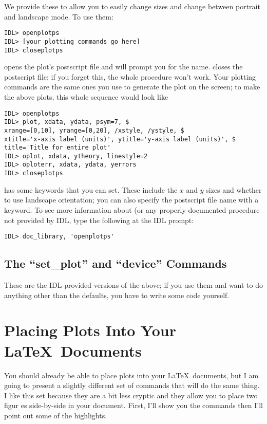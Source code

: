 	We provide these to allow you to easily change sizes and change
between portrait and landscape mode. To use them:

\begin{verbatim}
IDL> openplotps
IDL> [your plotting commands go here]
IDL> closeplotps
\end{verbatim}

\noindent \openplotps opens the plot's postscript file and will prompt
you for the name.  \closeplotps closes the postscript file; if you forget
this, the whole procedure won't work.  Your plotting commands are the
same ones you use to generate the plot on the screen; to make the above
plots, this whole sequence would look like

\begin{verbatim}
IDL> openplotps
IDL> plot, xdata, ydata, psym=7, $
xrange=[0,10], yrange=[0,20], /xstyle, /ystyle, $
xtitle='x-axis label (units)', ytitle='y-axis label (units)', $
title='Title for entire plot'
IDL> oplot, xdata, ytheory, linestyle=2
IDL> oploterr, xdata, ydata, yerrors
IDL> closeplotps
\end{verbatim}


	\openplotps has some keywords that you can set.  These include
the $x$ and $y$ sizes and whether to use landscape orientation; you can
also specify the postscript file name with a keyword.  To see more
information about \openplotps (or any properly-documented procedure not
provided by IDL, type the following at the IDL prompt:

\noindent \verb&IDL> doc_library, 'openplotps'&

\subsection{The ``set\_plot'' and ``device'' Commands}\label{set_plot}

	These are the IDL-provided versions of the above; if you use
them and want to do anything other than the defaults, you have to write
some code yourself. 


\section{Placing Plots Into Your \LaTeX\ Documents}\label{latex}

	You should already be able to place plots into your \LaTeX\
documents, but I am going to present a slightly different set of
commands that will do the same thing.  I like this set because they are
a bit less cryptic and they allow you to place two figur es side-by-side
in your document.  First, I'll show you the commands then I'll point out
some of the highlights. 

